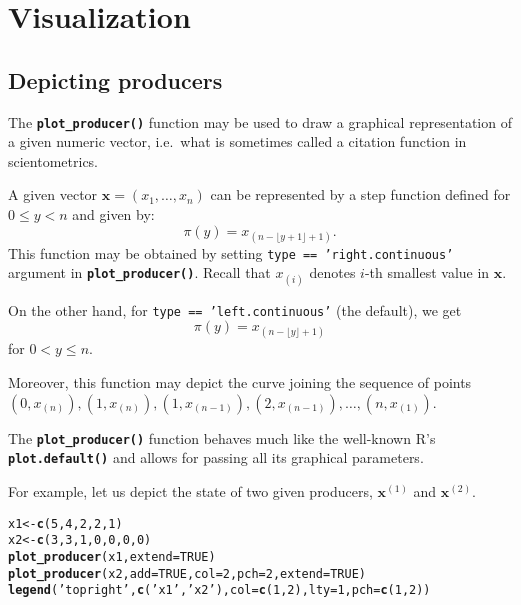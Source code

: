 \documentclass[11pt]{article}\usepackage{graphicx, color}
\makeatletter
\newcommand{\hlfunctioncall}[1]{\textcolor[rgb]{0.501960784313725,0,0.329411764705882}{\textbf{#1}}}%
\newcommand{\hlstring}[1]{\textcolor[rgb]{0.6,0.6,1}{#1}}%
\newenvironment{kframe}{%
 \def\at@end@of@kframe{}%
 \ifinner\ifhmode%
  \def\at@end@of@kframe{\end{minipage}}%
  \begin{minipage}{\columnwidth}%
 \fi\fi%
 \def\FrameCommand##1{\hskip\@totalleftmargin \hskip-\fboxsep
 \colorbox{shadecolor}{##1}\hskip-\fboxsep
     \hskip-\linewidth \hskip-\@totalleftmargin \hskip\columnwidth}%
 \MakeFramed {\advance\hsize-\width
   \@totalleftmargin\z@ \linewidth\hsize
   \@setminipage}}%
 {\par\unskip\endMakeFramed%
 \at@end@of@kframe}
\newenvironment{knitrout}{}{} %
\newcommand{\lang}[1]{\textsf{#1}\xspace}
\newcommand{\R}{\lang{R}}
\newcommand{\Rfunc}[1]{\texttt{\hlfunctioncall{#1}}}
\newcommand{\vect}[1]{{\mathbf{#1}}}
\theoremstyle{remark}
\theoremstyle{definition}
\makeatother
\begin{document}


\section{Visualization}


\subsection{Depicting producers}

The \Rfunc{plot\_producer()} function may be used to draw
a graphical representation of a given numeric vector,
i.e.~what is sometimes called a citation function in scientometrics.

A given vector $\mathbf{x}=(x_1,\dots,x_n)$ can be represented by a
step function defined for $0\le y<n$ and given by:
\[
   \pi(y)=x_{(n-\lfloor y+1\rfloor+1)}.
\]
This function may be obtained by setting \texttt{type == 'right.continuous'}
argument in \Rfunc{plot\_pro\-du\-cer()}.
Recall that $x_{(i)}$ denotes $i$-th smallest value in $\vect{x}$.

On the other hand, for \texttt{type == 'left.continuous'}
(the default), we get
\[
\pi(y)=x_{(n-\lfloor y\rfloor+1)}
\]
for $0< y\le n$.

Moreover, this function may depict the curve joining the sequence
of points $(0, x_{(n)}), (1, x_{(n)}),\allowbreak (1, x_{(n-1)}), (2, x_{(n-1)}),
\dots, (n, x_{(1)})$.


\medskip
The \Rfunc{plot\_producer()} function behaves much like
the well-known \R's \Rfunc{plot.default()} and allows for passing
all its graphical parameters.

For example, let us depict the state of two given producers,
$\vect{x}^{(1)}$ and $\vect{x}^{(2)}$.

\begin{knitrout}\small
{}\color{fgcolor}\begin{kframe}
\begin{alltt}
x1 <- \hlfunctioncall{c}(5, 4, 2, 2, 1)
x2 <- \hlfunctioncall{c}(3, 3, 1, 0, 0, 0, 0)
\hlfunctioncall{plot_producer}(x1, extend=TRUE)
\hlfunctioncall{plot_producer}(x2, add=TRUE, col=2, pch=2, extend=TRUE)
\hlfunctioncall{legend}(\hlstring{'topright'}, \hlfunctioncall{c}(\hlstring{'x1'}, \hlstring{'x2'}), col=\hlfunctioncall{c}(1, 2), lty=1, pch=\hlfunctioncall{c}(1, 2))
\end{alltt}
\end{kframe}
\end{knitrout}
\end{document}
